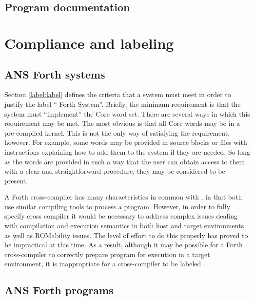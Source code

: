 \subsection{Program documentation} %

\section{Compliance and labeling} %

\subsection[Forth systms]{ANS Forth systems} %

Section \ref{label:label} defines the criteria that a system must
meet in order to justify the label `` Forth System''. Briefly,
the minimum requirement is that the system must ``implement'' the
Core word set. There are several ways in which this requirement may
be met. The most obvious is that all Core words may be in a pre-compiled
kernel. This is not the only way of satisfying the requirement,
however. For example, some words may be provided in source blocks or
files with instructions explaining how to add them to the system if
they are needed. So long as the words are provided in such a way that
the user can obtain access to them with a clear and straightforward
procedure, they may be considered to be present.

A Forth cross-compiler has many characteristics in common with ,
in that both use similar compiling tools to process a
program. However, in order to fully specify  cross compiler
it would be necessary to address complex issues dealing with compilation
and execution semantics in both host and target environments as well as
ROMability issues. The level of effort to do this properly has proved to
be impractical at this time. As a result, although it may be possible
for a Forth cross-compiler to correctly prepare  program
for execution in a target environment, it is inappropriate for a
cross-compiler to be labeled .

\subsection[Forth programgs]{ANS Forth programs} %

